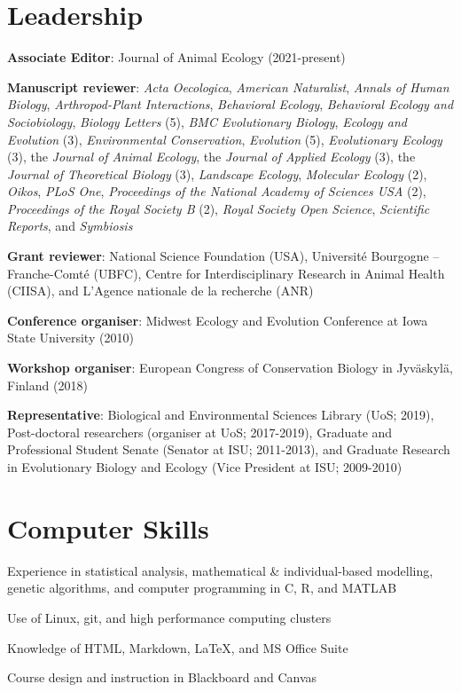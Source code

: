\documentclass[letterpaper]{article}
\renewenvironment{itemize}{
  \begin{list}{}{
    \setlength{\leftmargin}{1.5em}
  }
}{
  \end{list}
}
\begin{document}
\section*{Leadership}
\begin{itemize}
\item {\bf Associate Editor}: Journal of Animal Ecology (2021-present)
\item {\bf Manuscript reviewer}: {\it Acta Oecologica}, {\it American Naturalist}, {\it Annals of Human Biology}, {\it Arthropod-Plant Interactions}, {\it Behavioral Ecology}, {\it Behavioral Ecology and Sociobiology}, {\it Biology Letters} (5), {\it BMC Evolutionary Biology}, {\it Ecology and Evolution} (3), {\it Environmental Conservation}, {\it Evolution} (5), {\it Evolutionary Ecology} (3), the {\it Journal of Animal Ecology}, the {\it Journal of Applied Ecology} (3), the {\it Journal of Theoretical Biology} (3), {\it Landscape Ecology}, {\it Molecular Ecology} (2), {\it Oikos}, {\it PLoS One}, {\it Proceedings of the National Academy of Sciences USA} (2), {\it Proceedings of the Royal Society B} (2), {\it Royal Society Open Science}, {\it Scientific Reports}, and {\it Symbiosis}
\item {\bf Grant reviewer}: National Science Foundation (USA), Universit\'{e} Bourgogne -- Franche-Comt\'{e} (UBFC), Centre for Interdisciplinary Research in Animal Health (CIISA), and L'Agence nationale de la recherche (ANR)
\item {\bf Conference organiser}: Midwest Ecology and Evolution Conference at Iowa State University (2010)
\item {\bf Workshop organiser}: European Congress of Conservation Biology in Jyv\"{a}skyl\"{a}, Finland (2018)
\item {\bf Representative}: Biological and Environmental Sciences Library (UoS; 2019), Post-doctoral researchers (organiser at UoS; 2017-2019), Graduate and Professional Student Senate (Senator at ISU; 2011-2013), and Graduate Research in Evolutionary Biology and Ecology (Vice President at ISU; 2009-2010)
\end{itemize}

\section*{Computer Skills}
\begin{itemize}
\item Experience in statistical analysis, mathematical \& individual-based modelling, genetic algorithms, and computer programming in C, R, and MATLAB
\item Use of Linux, git, and high performance computing clusters
\item Knowledge of HTML, Markdown, \LaTeX, and MS Office Suite
\item Course design and instruction in Blackboard and Canvas
\end{itemize}
\end{document}
